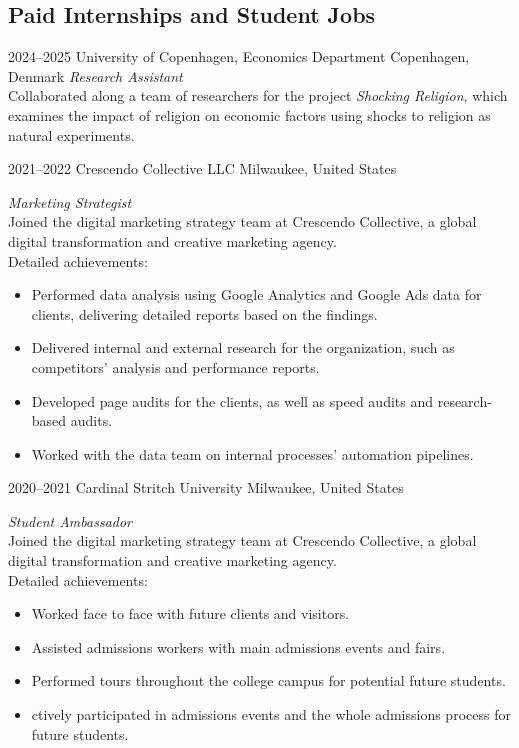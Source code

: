 \documentclass[]{friggeri-cv-a4}
\begin{document}
\subsection{Paid Internships and Student Jobs}

\begin{entrylist}

\entry
{2024--2025}
{University of Copenhagen, Economics Department}
{Copenhagen, Denmark}
{\emph{Research Assistant} \\
Collaborated along a team of researchers for the project \emph{Shocking Religion}, which examines the impact of religion on economic factors using shocks to religion as natural experiments. \\}


\entry
{2021--2022}
{Crescendo Collective LLC}
{Milwaukee, United States}
{\emph{Marketing Strategist} \\
Joined the digital marketing strategy team at Crescendo Collective, a global digital transformation and creative marketing agency.\\
Detailed achievements:
\begin{itemize}
\item Performed data analysis using Google Analytics and Google Ads data for clients, delivering detailed reports based on the findings.
\item Delivered internal and external research for the organization, such as competitors’ analysis and performance reports.
\item Developed page audits for the clients, as well as speed audits and research-based audits.
\item Worked with the data team on internal processes' automation pipelines.
\end{itemize}}


\entry
{2020--2021}
{Cardinal Stritch University}
{Milwaukee, United States}
{\emph{Student Ambassador} \\
Joined the digital marketing strategy team at Crescendo Collective, a global digital transformation and creative marketing agency.\\
Detailed achievements:
\begin{itemize}
\item Worked face to face with future clients and visitors.
\item Assisted admissions workers with main admissions events and fairs.
\item  Performed tours throughout the college campus for potential future students.
\item ctively participated in admissions events and the whole admissions process for future students.
\end{itemize}}



\end{entrylist}
\end{document}
